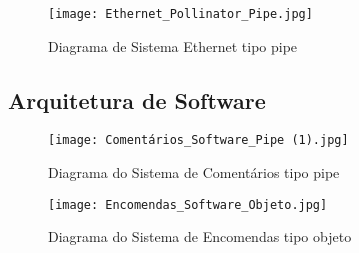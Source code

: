 	\begin{figure}[H]
    \begin{center}
        \texttt{[image: Ethernet\_Pollinator\_Pipe.jpg]}
        \caption{Diagrama de Sistema Ethernet tipo pipe} \label{sistema}
    \end{center}
   \end{figure} 

    \subsection{Arquitetura de Software}
	
	\begin{figure}[H]
    \begin{center}
        \texttt{[image: Comentários\_Software\_Pipe (1).jpg]}
        \caption{Diagrama do Sistema de Comentários tipo pipe} \label{sistema}
    \end{center}
   \end{figure} 
   
   \begin{figure}[H]
    \begin{center}
        \texttt{[image: Encomendas\_Software\_Objeto.jpg]}
        \caption{Diagrama do Sistema de Encomendas tipo objeto} \label{sistema}
    \end{center}
   \end{figure} 